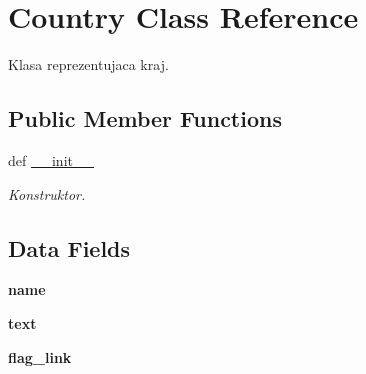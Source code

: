 \hypertarget{classwszystko_1_1_country}{\section{Country Class Reference}
\label{classwszystko_1_1_country}
}


Klasa reprezentujaca kraj.  


\subsection*{Public Member Functions}
\begin{DoxyCompactItemize}
\item 
\hypertarget{classwszystko_1_1_country_ac775ee34451fdfa742b318538164070e}{def \hyperlink{classwszystko_1_1_country_ac775ee34451fdfa742b318538164070e}{\-\_\-\-\_\-init\-\_\-\-\_\-}}\label{classwszystko_1_1_country_ac775ee34451fdfa742b318538164070e}

\begin{DoxyCompactList}\small\item\em Konstruktor. \end{DoxyCompactList}\end{DoxyCompactItemize}
\subsection*{Data Fields}
\begin{DoxyCompactItemize}
\item 
\hypertarget{classwszystko_1_1_country_ab74e6bf80237ddc4109968cedc58c151}{{\bfseries name}}\label{classwszystko_1_1_country_ab74e6bf80237ddc4109968cedc58c151}

\item 
\hypertarget{classwszystko_1_1_country_af575f17e6be3f269b86b041a60560dbf}{{\bfseries text}}\label{classwszystko_1_1_country_af575f17e6be3f269b86b041a60560dbf}

\item 
\hypertarget{classwszystko_1_1_country_a6a8ee0fe460fac658405fd8e7cdd7c46}{{\bfseries flag\-\_\-link}}\label{classwszystko_1_1_country_a6a8ee0fe460fac658405fd8e7cdd7c46}

\end{DoxyCompactItemize}
